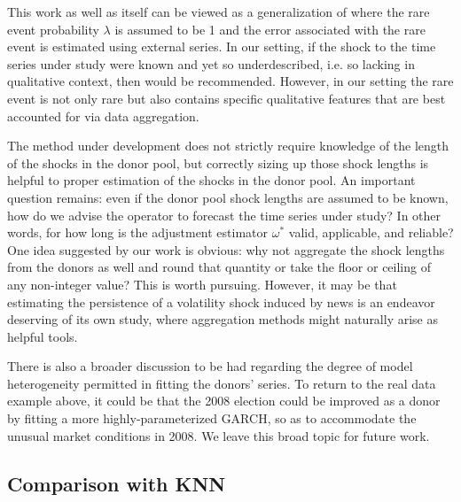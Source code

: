 \documentclass{uiucthesis2021}
\theoremstyle{definition}
\begin{document}
This work as well as \cite[][]{lin2021minimizing} itself can be viewed as a generalization of \cite[][]{phillips1996forecasting} where the rare event probability $\lambda$ is assumed to be 1 and the error associated with the rare event is estimated using external series.  In our setting, if the shock to the time series under study were known and yet so underdescribed, i.e. so lacking in qualitative context, then \cite[][]{phillips1996forecasting} would be recommended.  However, in our setting the rare event is not only rare but also contains specific qualitative features that are best accounted for via data aggregation.

The method under development does not strictly require knowledge of the length of the shocks in the donor pool, but correctly sizing up those shock lengths is helpful to proper estimation of the shocks in the donor pool.  An important question remains: even if the donor pool shock lengths are assumed to be known, how do we advise the operator to forecast the time series under study?  In other words, for how long is the adjustment estimator $\omega^{*}$ valid, applicable, and reliable?  One idea suggested by our work is obvious: why not aggregate the shock lengths from the donors as well and round that quantity or take the floor or ceiling of any non-integer value?  This is worth pursuing.  However, it may be that estimating the persistence of a volatility shock induced by news is an endeavor deserving of its own study, where aggregation methods might naturally arise as helpful tools.

There is also a broader discussion to be had regarding the degree of model heterogeneity permitted in fitting the donors' series.  To return to the real data example above, it could be that the 2008 election could be improved as a donor by fitting a more highly-parameterized GARCH, so as to accommodate the unusual market conditions in 2008.  We leave this broad topic for future work.

\subsection{Comparison with KNN}
\end{document}
